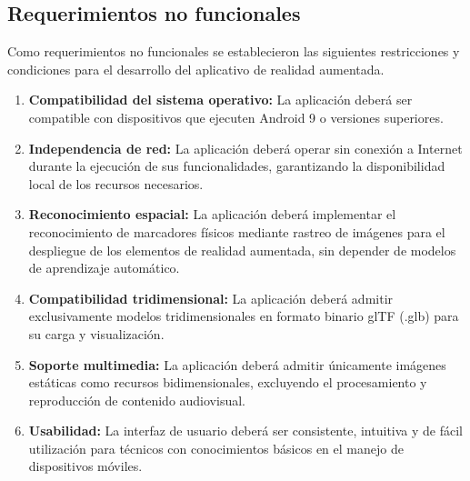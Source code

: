     \subsection{Requerimientos no funcionales}

        Como requerimientos no funcionales se establecieron las siguientes restricciones y condiciones para el desarrollo del aplicativo de realidad aumentada.

        \begin{enumerate}

            \item \textbf{Compatibilidad del sistema operativo:} La aplicación deberá ser compatible con dispositivos que ejecuten Android 9 o versiones superiores.

            \item \textbf{Independencia de red:} La aplicación deberá operar sin conexión a Internet durante la ejecución de sus funcionalidades, garantizando la disponibilidad local de los recursos necesarios.

            \item \textbf{Reconocimiento espacial:} La aplicación deberá implementar el reconocimiento de marcadores físicos mediante rastreo de imágenes para el despliegue de los elementos de realidad aumentada, sin depender de modelos de aprendizaje automático.

            \item \textbf{Compatibilidad tridimensional:} La aplicación deberá admitir exclusivamente modelos tridimensionales en formato binario glTF (.glb) para su carga y visualización.

            \item \textbf{Soporte multimedia:} La aplicación deberá admitir únicamente imágenes estáticas como recursos bidimensionales, excluyendo el procesamiento y reproducción de contenido audiovisual.

            \item \textbf{Usabilidad:} La interfaz de usuario deberá ser consistente, intuitiva y de fácil utilización para técnicos con conocimientos básicos en el manejo de dispositivos móviles.

        \end{enumerate}